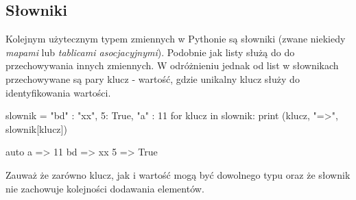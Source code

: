 % 
% 
% 
% 

\subsection{Słowniki}

Kolejnym użytecznym typem zmiennych w Pythonie są słowniki (zwane niekiedy \emph{mapami} lub \emph{tablicami asocjacyjnymi}). Podobnie jak listy służą do do przechowywania innych zmiennych.
W odróżnieniu jednak od list w słownikach przechowywane są pary klucz - wartość, gdzie unikalny klucz służy do identyfikowania wartości.

\begin{CodeFrame}[python]{0.60\textwidth}
slownik = { "bd" : "xx", 5: True, "a" : 11 }
for klucz in slownik:
    print (klucz, "=>", slownik[klucz])
\end{CodeFrame}
\begin{CodeFrame}{auto}
a => 11
bd => xx
5 => True
\end{CodeFrame}

Zauważ że zarówno klucz, jak i wartość mogą być dowolnego typu oraz że słownik nie zachowuje kolejności dodawania elementów.

